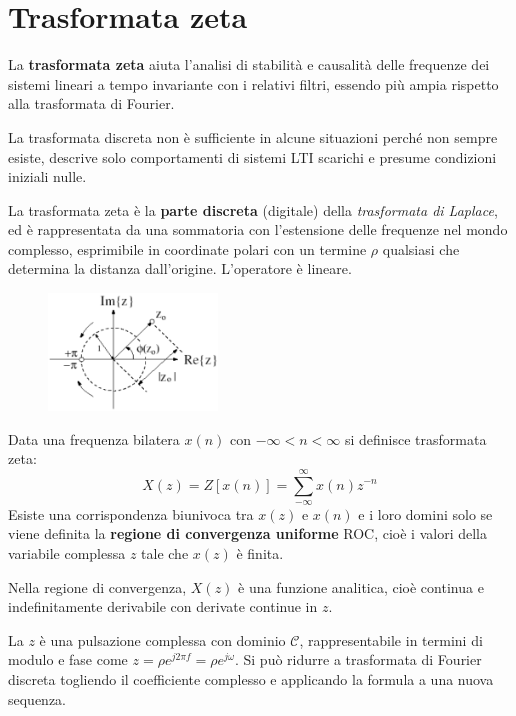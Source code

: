 \section{Trasformata zeta}
La \textbf{trasformata zeta} aiuta l'analisi di stabilità e causalità delle frequenze dei sistemi lineari a tempo invariante con i relativi filtri, essendo più ampia rispetto alla trasformata di Fourier. 

La trasformata discreta non è sufficiente in alcune situazioni perché non sempre esiste, descrive solo comportamenti di sistemi LTI scarichi e presume condizioni iniziali nulle.

La trasformata zeta è la \textbf{parte discreta} (digitale) della \textit{trasformata di Laplace}, ed è rappresentata da una sommatoria con l'estensione delle frequenze nel mondo complesso, esprimibile in coordinate polari con un termine $\rho$ qualsiasi che determina la distanza dall'origine. L'operatore è lineare.

\begin{figure}
	\vspace{-15pt}
	\includegraphics[width=0.4\textwidth]{Lezioni/Immagini/zeta}
	\vspace{-40pt}
\end{figure}

Data una frequenza bilatera $x(n)$ con $-\infty < n < \infty$ si definisce trasformata zeta:
$$X(z) = Z[x(n)] = \sum_{-\infty}^{\infty} x(n)z^{-n}$$
Esiste una corrispondenza biunivoca tra $x(z)$ e $x(n)$ e i loro domini solo se viene definita la \textbf{regione di convergenza uniforme} ROC, cioè i valori della variabile complessa $z$ tale che $x(z)$ è finita.

Nella regione di convergenza, $X(z)$ è una funzione analitica, cioè continua e indefinitamente derivabile con derivate continue in $z$.

La $z$ è una pulsazione complessa con dominio $\mathcal{C}$, rappresentabile in termini di modulo e fase come $z = \rho e^{j2\pi f} = \rho e^{j\omega}$. Si può ridurre a trasformata di Fourier discreta togliendo il coefficiente complesso e applicando la formula a una nuova sequenza. 

